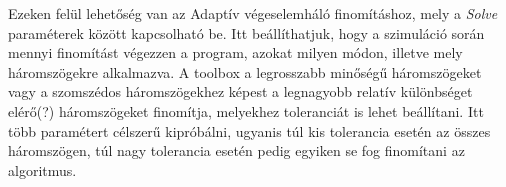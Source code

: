 Ezeken felül lehetőség van az Adaptív végeselemháló finomításhoz, mely a \textit{Solve} paraméterek között kapcsolható be. Itt beállíthatjuk, hogy a szimuláció során mennyi finomítást végezzen a program, azokat milyen módon, illetve mely háromszögekre alkalmazva. A toolbox a legrosszabb minőségű háromszögeket vagy a szomszédos háromszögekhez képest a legnagyobb relatív különbséget elérő(?) háromszögeket finomítja, melyekhez toleranciát is lehet beállítani. Itt több paramétert célszerű kipróbálni, ugyanis túl kis tolerancia esetén az összes háromszögen, túl nagy tolerancia esetén pedig egyiken se fog finomítani az algoritmus.

























